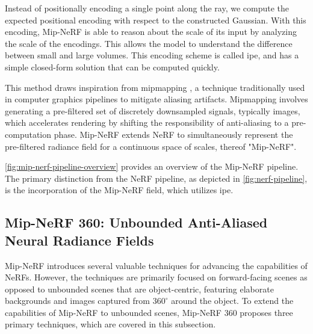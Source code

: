 Instead of positionally encoding a single point along the ray, we compute the expected positional encoding with respect to the 
constructed Gaussian. With this encoding, Mip-NeRF is able to reason about the scale of its input by analyzing the scale of the encodings. This allows the model to understand the difference between small and large volumes. This encoding scheme is called \acrfull{ipe}, and has a simple closed-form solution that can be computed quickly.



This method draws inspiration from mipmapping \cite{williams1983pyramidal}, a technique traditionally used in computer graphics pipelines to mitigate aliasing artifacts. Mipmapping involves generating a pre-filtered set of discretely downsampled signals, typically images, which accelerates rendering by shifting the responsibility of anti-aliasing to a pre-computation phase. Mip-NeRF extends NeRF to simultaneously represent the pre-filtered radiance field for a continuous space of scales, thereof "Mip-NeRF".

\autoref{fig:mip-nerf-pipeline-overview} provides an overview of the Mip-NeRF pipeline. The primary distinction from the NeRF pipeline, as depicted in \autoref{fig:nerf-pipeline}, is the incorporation of the Mip-NeRF field, which utilizes \acrshort{ipe}.





\subsection[Mip-NeRF 360]{Mip-NeRF 360: Unbounded Anti-Aliased Neural Radiance Fields} \label{sec:mipnerf360}
Mip-NeRF introduces several valuable techniques for advancing the capabilities of NeRFs. However, the techniques are primarily focused on forward-facing scenes \cite{mildenhall2019llff} as opposed to unbounded scenes that are object-centric, featuring elaborate backgrounds and images captured from $360^\circ$ around the object. To extend the capabilities of Mip-NeRF to unbounded scenes, Mip-NeRF 360 \cite{barron_mip-nerf_2022} proposes three primary techniques, which are covered in this subsection.

